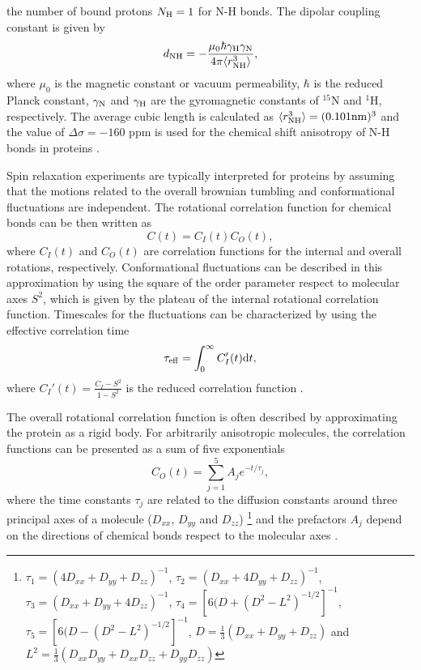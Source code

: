 \documentclass[pre,aps,floatfix,authordate1-4,twocolumn]{revtex4-1}
\begin{document}
the number of bound protons $N_{\rm{H}}=1$ for N-H bonds.
The dipolar coupling constant is given by
\begin{equation}
d_{\rm{NH}}=-\frac{\mu_0\hbar\gamma_{\rm{H}}\gamma_{\rm{N}}}{4\pi\langle r_{\rm{NH}}^3\rangle},\nonumber
\end{equation}
where $\mu_0$ is the magnetic constant or vacuum permeability, $\hbar$ is the reduced Planck constant,
$\gamma_{\rm{N}}$ and $\gamma_{\rm{H}}$ are the gyromagnetic constants of $^{15}$N and $^1$H, respectively.
The average cubic length is calculated as $\langle r_{\rm{NH}}^3\rangle = (0.101{\rm nm})^3$ and the 
value of $\Delta \sigma = -160$ ppm is used for the chemical shift anisotropy of N-H bonds in 
proteins \cite{kay89,hiyama88}.

Spin relaxation experiments are typically interpreted for proteins by
assuming that the motions related to the overall brownian tumbling 
and conformational fluctuations are independent.
The rotational correlation function for chemical bonds can be then written
as  \cite{wennerstrom79,Lipari82,jarymowycz06,korzhnev01,halle09}
\begin{equation}\label{CORRFsep}
  C(t)=C_I(t)C_O(t),
\end{equation}
where $C_I(t)$ and $C_O(t)$ are correlation functions for the internal and overall
rotations, respectively. Conformational fluctuations can be described
in this approximation by using the square of the order parameter respect to 
molecular axes $S^2$, which is given by the plateau of the internal rotational 
correlation function. Timescales for the fluctuations can be characterized by
using the effective correlation time 
\begin{equation}\label{effCT}
  \tau_{\rm eff}=\int_0^\infty C_I'(t) \mathrm{d}t,
\end{equation}
where $C_I'(t)=\frac{C_I-S^2}{1-S^2}$ is the reduced correlation function \cite{Lipari82}.

The overall rotational correlation function is often described
by approximating the protein as a rigid body.
For arbitrarily anisotropic molecules, the correlation functions
can  be presented as a sum of five exponentials~\cite{woessner62,korzhnev01}
\begin{equation}\label{CORRFanisot}
  C_O(t)=\sum_{j=1}^5 A_j e^{-t/\tau_j},
\end{equation}
where the time constants $\tau_j$ are related 
to the diffusion constants around
three principal axes of a molecule
($D_{xx}$, $D_{yy}$ and $D_{zz}$)  
\footnote{
$\tau_1=(4D_{xx}+D_{yy}+D_{zz})^{-1}$,
$\tau_2=(D_{xx}+4D_{yy}+D_{zz})^{-1}$,
$\tau_3=(D_{xx}+D_{yy}+4D_{zz})^{-1}$,
$\tau_4=[6(D+(D^2-L^2)^{-1/2}]^{-1}$,
$\tau_5=[6(D-(D^2-L^2)^{-1/2}]^{-1}$,
$D=\frac{1}{3}(D_{xx}+D_{yy}+D_{zz})$ and 
$L^2=\frac{1}{3}(D_{xx}D_{yy}+D_{xx}D_{zz}+D_{yy}D_{zz})$}
and the prefactors $A_j$ depend on the directions of chemical bonds 
respect to the molecular axes \cite{woessner62,luginbuhl97}.
\end{document}
